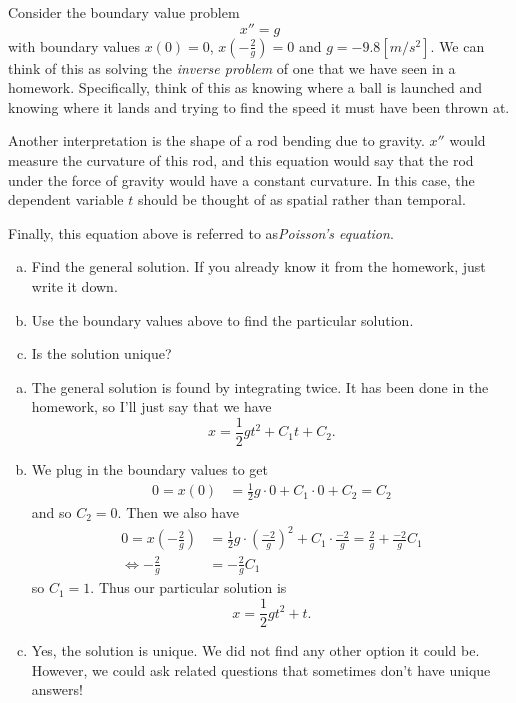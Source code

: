 \documentclass[12pt]{article} %
\begin{document}
\begin{problem}
Consider the boundary value problem
\[
x''=g
\]
with boundary values $x(0)=0$, $x\left(-\frac{2}{g}\right)=0$ and $g=-9.8[m/s^2]$.  We can think of this as solving the \emph{inverse problem} of one that we have seen in a homework. Specifically, think of this as knowing where a ball is launched and knowing where it lands and trying to find the speed it must have been thrown at.  

Another interpretation is the shape of a rod bending due to gravity.  $x''$ would measure the curvature of this rod, and this equation would say that the rod under the force of gravity would have a constant curvature. In this case, the dependent variable $t$ should be thought of as spatial rather than temporal.

Finally, this equation above is referred to as\emph{Poisson's equation}.
\begin{enumerate}[(a)]
    \item Find the general solution. If you already know it from the homework, just write it down.
    \item Use the boundary values above to find the particular solution.
    \item Is the solution unique? 
\end{enumerate}
\end{problem}
\begin{solution}
\begin{enumerate}[(a)]
    \item The general solution is found by integrating twice.  It has been done in the homework, so I'll just say that we have
    \[
    x=\frac{1}{2}gt^2+C_1t+C_2.
    \]
    \item We plug in the boundary values to get
    \begin{align*}
        0=x(0)&=\frac{1}{2}g\cdot 0 + C_1 \cdot 0 + C_2 = C_2
    \end{align*}
    and so $C_2=0$. Then we also have
    \begin{align*}
        0=x\left(-\frac{2}{g}\right)&= \frac{1}{2}g\cdot \left(\frac{-2}{g}\right)^2+C_1 \cdot \frac{-2}{g}= \frac{2}{g}+\frac{-2}{g}C_1\\
        \iff -\frac{2}{g}&=-\frac{2}{g}C_1
    \end{align*}
    so $C_1=1$. Thus our particular solution is
    \[
    x=\frac{1}{2}gt^2 + t.
    \]
    \item Yes, the solution is unique.  We did not find any other option it could be.  However, we could ask related questions that sometimes don't have unique answers!
\end{enumerate}
\end{solution}
\end{document}
